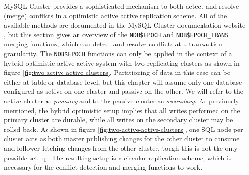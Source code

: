 MySQL Cluster provides a sophisticated mechanism to both detect and resolve (merge) conflicts in a optimistic active active replication scheme.
All of the available methods are documented in the MySQL Cluster documentation website \cite{mysql-cluster-documentation-replication}, but this section gives an overview of the \texttt{NDB\$EPOCH} and \texttt{NDB\$EPOCH\_TRANS} merging functions, which can detect and resolve conflicts at a transaction granularity.
The \texttt{NDB\$EPOCH} functions can only be applied in the context of a hybrid optimistic active active system with two replicating clusters as shown in figure \ref{fig:two-active-active-clusters}.
Partitioning of data in this case can be either at table or database level, but this chapter will assume only one database configured as active on one cluster and passive on the other.
We will refer to the active cluster as \emph{primary} and to the passive cluster as \emph{secondary}.
As previously mentioned, the hybrid optimistic setup implies that all writes performed on the primary cluster are durable, while all writes on the secondary cluster may be rolled back.
As shown in figure \ref{fig:two-active-active-clusters}, one SQL node per cluster acts as both master publishing changes for the other cluster to consume and follower fetching changes from the other cluster, tough this is not the only possible set-up.
The resulting setup is a circular replication scheme, which is necessary for the conflict detection and merging functions to work.

